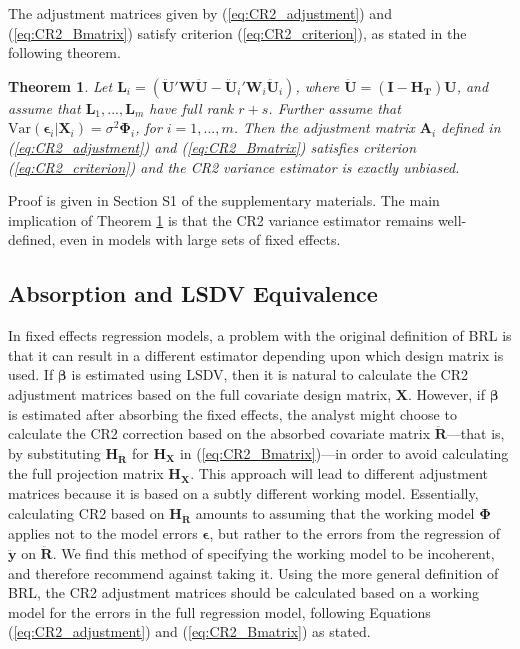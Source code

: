 \documentclass[12pt]{article}\usepackage[]{graphicx}\usepackage[]{color}
\newtheorem{thm}{Theorem}
\newcommand{\Var}{\text{Var}}
\newcommand{\bm}{\mathbf}
\newcommand{\bs}{\boldsymbol}
\begin{document}
The adjustment matrices given by (\ref{eq:CR2_adjustment}) and (\ref{eq:CR2_Bmatrix}) satisfy criterion (\ref{eq:CR2_criterion}), as stated in the following theorem.

\begin{thm}
\label{thm:BRL_FE}
Let $\bm{L}_i = \left(\bm{\ddot{U}}'\bm{W}\bm{\ddot{U}} - \bm{\ddot{U}}_i'\bm{W}_i\bm{\ddot{U}}_i\right)$, where $\bm{\ddot{U}} = \left(\bm{I} - \bm{H_T}\right)\bm{U}$, and assume that $\bm{L}_1,...,\bm{L}_m$ have full rank $r + s$. Further assume that $\Var\left(\bs\epsilon_i\left|\bm{X}_i\right.\right) = \sigma^2 \bs\Phi_i$, for $i = 1,...,m$. Then the adjustment matrix $\bm{A}_i$ defined in (\ref{eq:CR2_adjustment}) and (\ref{eq:CR2_Bmatrix}) satisfies criterion (\ref{eq:CR2_criterion}) and the CR2 variance estimator is exactly unbiased.
\end{thm}

Proof is given in Section S1 of the supplementary materials. The main implication of Theorem \ref{thm:BRL_FE} is that the CR2 variance estimator remains well-defined, even in models with large sets of fixed effects.

\subsection{Absorption and LSDV Equivalence}

In fixed effects regression models, a problem with the original definition of BRL is that it can result in a different estimator depending upon which design matrix is used.
If $\bs\beta$ is estimated using LSDV, then it is natural to calculate the CR2 adjustment matrices based on the full covariate design matrix, $\bm{X}$. However, if $\bs\beta$ is estimated after absorbing the fixed effects, the analyst might choose to calculate the CR2 correction based on the absorbed covariate matrix $\bm{\ddot{R}}$---that is, by substituting $\bm{H_{\ddot{R}}}$ for $\bm{H_X}$ in (\ref{eq:CR2_Bmatrix})---in order to avoid calculating the full projection matrix $\bm{H_X}$. 
This approach will lead to different adjustment matrices because it is based on a subtly different working model. 
Essentially, calculating CR2 based on $\bm{H_{\ddot{R}}}$ amounts to assuming that the working model $\bs\Phi$ applies not to the model errors $\bs\epsilon$, but rather to the errors from the regression of $\bm{\ddot{y}}$ on $\bm{\ddot{R}}$.
We find this method of specifying the working model to be incoherent, and therefore recommend against taking it.
Using the more general definition of BRL, the CR2 adjustment matrices should be calculated based on a working model for the errors in the full regression model, following Equations (\ref{eq:CR2_adjustment}) and (\ref{eq:CR2_Bmatrix}) as stated. 
\end{document}
